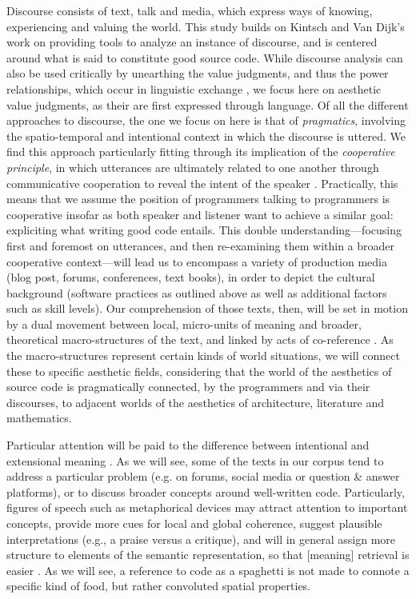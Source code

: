 Discourse consists of text, talk and media, which express ways of knowing, experiencing and valuing the world. This study builds on Kintsch and Van Dijk's work on providing tools to analyze an instance of discourse, and is centered around what is said to constitute good source code. While discourse analysis can also be used critically by unearthing the value judgments, and thus the power relationships, which occur in linguistic exchange \citep{mullet_general_2018a}, we focus here on aesthetic value judgments, as their are first expressed through language. Of all the different approaches to discourse, the one we focus on here is that of \emph{pragmatics}, involving the spatio-temporal and intentional context in which the discourse is uttered. We find this approach particularly fitting through its implication of the \emph{cooperative principle}, in which utterances are ultimately related to one another through communicative cooperation to reveal the intent of the speaker \citep{schiffrin_approaches_1994}. Practically, this means that we assume the position of programmers talking to programmers is cooperative insofar as both speaker and listener want to achieve a similar goal: expliciting what writing good code entails. This double understanding—focusing first and foremost on utterances, and then re-examining them within a broader cooperative context—will lead us to encompass a variety of production media (blog post, forums, conferences, text books), in order to depict the cultural background (software practices as outlined above as well as additional factors such as skill levels). Our comprehension of those texts, then, will be set in motion by a dual movement between local, micro-units of meaning and broader, theoretical macro-structures of the text, and linked by acts of co-reference \citep{kintsch_model_1978}. As the macro-structures represent certain kinds of world situations, we will connect these to specific aesthetic fields, considering that the world of the aesthetics of source code is pragmatically connected, by the programmers and via their discourses, to adjacent worlds of the aesthetics of architecture, literature and mathematics. 

Particular attention will be paid to the difference between intentional and extensional meaning \citep{dijk_strategies_1983b}. As we will see, some of the texts in our corpus tend to address a particular problem (e.g. on forums, social media or question \& answer platforms), or to discuss broader concepts around well-written code. Particularly, figures of speech such as metaphorical devices may attract attention to important concepts, provide more cues for local and global coherence, suggest plausible interpretations (e.g., a praise versus a critique), and will in general assign more structure to elements of the semantic representation, so that [meaning] retrieval is easier \citep{dijk_strategies_1983b}. As we will see, a reference to code as a spaghetti is not made to connote a specific kind of food, but rather convoluted spatial properties.

